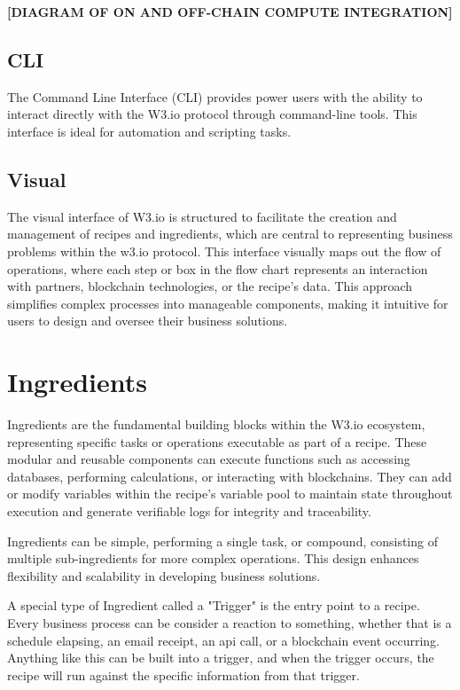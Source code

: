 \documentclass[11pt]{article}
\newcommand{\needs}[1]{\textbf{\color{red}[\MakeUppercase{#1}]}}
\begin{document}
\needs{DIAGRAM OF ON AND OFF-CHAIN COMPUTE INTEGRATION}

\subsection{CLI}
The Command Line Interface (CLI) provides power users with the ability to interact directly with the W3.io protocol through command-line tools. This interface is ideal for automation and scripting tasks.

\subsection{Visual}
The visual interface of W3.io is structured to facilitate the creation and management of recipes and ingredients, which are central to representing business problems within the w3.io protocol. This interface visually maps out the flow of operations, where each step or box in the flow chart represents an interaction with partners, blockchain technologies, or the recipe's data. This approach simplifies complex processes into manageable components, making it intuitive for users to design and oversee their business solutions.

\section{Ingredients}
Ingredients are the fundamental building blocks within the W3.io ecosystem, representing specific tasks or operations executable as part of a recipe. These modular and reusable components can execute functions such as accessing databases, performing calculations, or interacting with blockchains. They can add or modify variables within the recipe's variable pool to maintain state throughout execution and generate verifiable logs for integrity and traceability.

Ingredients can be simple, performing a single task, or compound, consisting of multiple sub-ingredients for more complex operations. This design enhances flexibility and scalability in developing business solutions.

A special type of Ingredient called a "Trigger" is the entry point to a recipe. Every business process can be consider a reaction to something, whether that is a schedule elapsing, an email receipt, an api call, or a blockchain event occurring. Anything like this can be built into a trigger, and when the trigger occurs, the recipe will run against the specific information from that trigger. 
\end{document}
